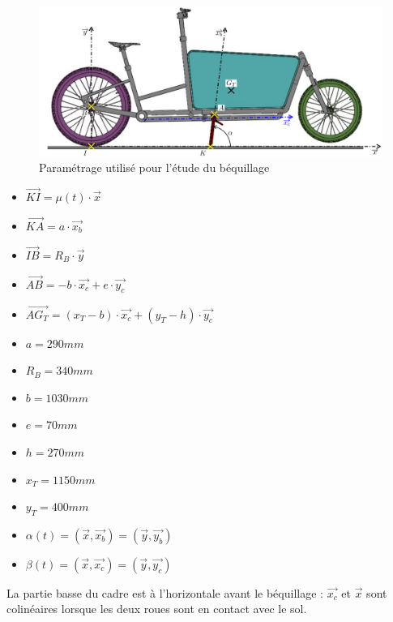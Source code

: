 \begin{figure}[ht!]
\begin{center}
\includegraphics[width=0.8\linewidth]{img/fig03}
\caption{\label{fig03}Paramétrage utilisé pour l'étude du béquillage}
\end{center}
\end{figure}

\begin{minipage}{0.3\linewidth}
\begin{itemize}
 \item $\overrightarrow{KI}=\mu(t)\cdot \vec{x}$
 \item $\overrightarrow{KA}=a\cdot \vec{x_b}$
 \item $\overrightarrow{IB}=R_B\cdot \vec{y}$
 \item $\overrightarrow{AB}=-b\cdot \vec{x_c}+e\cdot \vec{y_c}$
 \item $\overrightarrow{AG_T}=(x_T-b)\cdot \vec{x_c}+(y_T-h)\cdot \vec{y_c}$
 \end{itemize}
\end{minipage}\hfill
\begin{minipage}{0.3\linewidth}
\begin{itemize}
 \item $a=290mm$
 \item $R_B=340mm$
 \item $b=1030mm$
 \item $e=70mm$
 \item $h=270mm$
 \item $x_T=1150mm$
 \item $y_T=400mm$
\end{itemize}
\end{minipage}\hfill
\begin{minipage}{0.35\linewidth}
\begin{itemize}
 \item $\alpha(t)=(\vec{x},\vec{x_b})=(\vec{y},\vec{y_b})$
 \item $\beta(t)=(\vec{x},\vec{x_c})=(\vec{y},\vec{y_c})$
\end{itemize}
La partie basse du cadre est à l'horizontale avant le béquillage :
$\vec{x_c}$ et $\vec{x}$ sont colinéaires lorsque les deux roues sont en contact
avec le sol.
\end{minipage}

